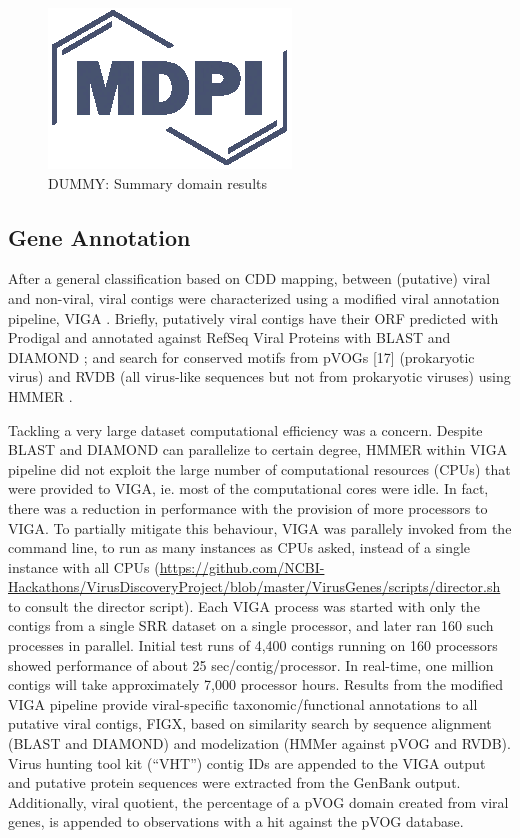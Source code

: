 \documentclass[genes, moreauthors]{Definitions/mdpi}
\begin{document}
  \begin{figure}
    \centering
    \includegraphics{Definitions/logo-mdpi}
    \caption{DUMMY: Summary domain results
            \label{fig:domain_summary}}
  \end{figure}

  \subsection{Gene Annotation}
  After a general classification based on CDD mapping, between (putative)
  viral and non-viral, viral contigs were characterized using a modified viral
  annotation pipeline, VIGA \cite{Gonzalez-Tortuero2018}. Briefly, putatively
  viral contigs have their ORF predicted with Prodigal \cite{Hyatt2010} and
  annotated against RefSeq Viral Proteins with BLAST \citep{Camacho2009} and
  DIAMOND \citep{Buchfink2015}; and search for conserved motifs
  from pVOGs [17] (prokaryotic virus) and RVDB \cite{Goodacre2018}
  (all virus-like sequences but not from prokaryotic viruses) using HMMER
  \cite{hmmer}.

  Tackling a very large dataset computational efficiency was a concern. Despite
  BLAST and DIAMOND can parallelize to certain degree, HMMER within VIGA
  pipeline did not exploit the large number of computational resources (CPUs)
  that were provided to VIGA, ie. most of the computational cores were idle. In
  fact, there was a reduction in performance with the provision of more
  processors to VIGA. To partially mitigate this behaviour, VIGA was parallely
  invoked from the command line, to run as many instances as CPUs asked,
  instead of a single instance with all CPUs
  (\url{https://github.com/NCBI-Hackathons/VirusDiscoveryProject/blob/master/VirusGenes/scripts/director.sh}
  to consult the director script). Each VIGA process was started with only the
  contigs from a single SRR dataset on a single processor, and later ran 160
  such processes in parallel. Initial test runs of 4,400 contigs running on 160
  processors showed performance of about 25 sec/contig/processor. In real-time,
  one million contigs will take approximately 7,000 processor hours. Results
  from the modified VIGA pipeline provide viral-specific taxonomic/functional
  annotations to all putative viral contigs, FIGX, based on similarity search
  by sequence alignment (BLAST and DIAMOND) and modelization (HMMer against
  pVOG and RVDB). Virus hunting tool kit (“VHT”) contig IDs are appended to the
  VIGA output and putative protein sequences were extracted from the GenBank
  output. Additionally, viral quotient, the percentage of a pVOG domain created
  from viral genes, is appended to observations with a hit against the pVOG
  database.
\end{document}
